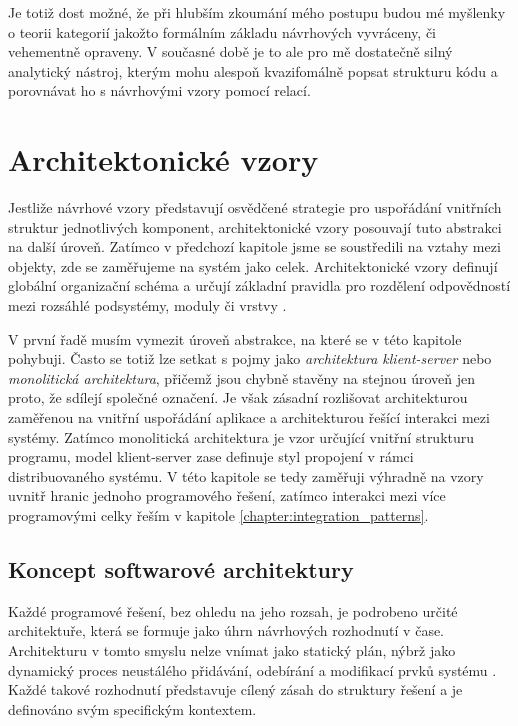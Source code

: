 \documentclass[FM,DP,fonts]{tulthesis}
\begin{document}
Je totiž dost možné, že při hlubším zkoumání mého postupu budou mé myšlenky o teorii kategorií jakožto formálním základu návrhových vyvráceny, či vehementně opraveny. V současné době je to ale pro mě dostatečně silný analytický nástroj, kterým mohu alespoň kvazifomálně popsat strukturu kódu a porovnávat ho s návrhovými vzory pomocí relací.

\clearpage
\section{Architektonické vzory}
\label{chapter:architectural_patterns}
Jestliže návrhové vzory představují osvědčené strategie pro uspořádání vnitřních struktur jednotlivých komponent, architektonické vzory posouvají tuto abstrakci na další úroveň. Zatímco v předchozí kapitole jsme se soustředili na vztahy mezi objekty, zde se zaměřujeme na systém jako celek. Architektonické vzory definují globální organizační schéma a určují základní pravidla pro rozdělení odpovědností mezi rozsáhlé podsystémy, moduly či vrstvy \parencite{gfg-architectural-patterns}.

V první řadě musím vymezit úroveň abstrakce, na které se v této kapitole pohybuji. Často se totiž lze setkat s pojmy jako \textit{architektura klient-server} nebo \textit{monolitická architektura}, přičemž jsou chybně stavěny na stejnou úroveň jen proto, že sdílejí společné označení. Je však zásadní rozlišovat architekturou zaměřenou na vnitřní uspořádání aplikace a architekturou řešící interakci mezi systémy. Zatímco monolitická architektura je vzor určující vnitřní strukturu programu, model klient-server zase definuje styl propojení v rámci distribuovaného systému. V této kapitole se tedy zaměřuji výhradně na vzory uvnitř hranic jednoho programového řešení, zatímco interakci mezi více programovými celky řeším v kapitole \ref{chapter:integration_patterns}.

\subsection{Koncept softwarové architektury}
Každé programové řešení, bez ohledu na jeho rozsah, je podrobeno určité architektuře, která se formuje jako úhrn návrhových rozhodnutí v čase. Architekturu v tomto smyslu nelze vnímat jako statický plán, nýbrž jako dynamický proces neustálého přidávání, odebírání a modifikací prvků systému \parencite{jansen2005software}. Každé takové rozhodnutí představuje cílený zásah do struktury řešení a je definováno svým specifickým kontextem.
\end{document}
